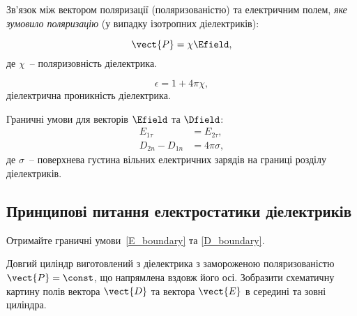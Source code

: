 \begin{Theory}
  Зв'язок між вектором поляризації (поляризованістю) та електричним полем, \emph{яке зумовило поляризацію} (у випадку ізотропних діелектриків):

  \begin{equation}
	  \vect{P} = \chi\Efield,
  \end{equation}
  де $\chi$~-- поляризовність діелектрика.

  \begin{equation}
	  \epsilon = 1 + 4\pi\chi,
  \end{equation}
  діелектрична проникність діелектрика.


  Граничні умови для векторів $\Efield$ та $\Dfield$:
  \begin{align}
	  E_{1\tau}       & = E_{2\tau},  \label{E_boundary} \\
	  D_{2n} - D_{1n} & = 4\pi\sigma, \label{D_boundary}
  \end{align}
  де $\sigma$~-- поверхнева густина вільних електричних зарядів на границі розділу діелектриків.
\end{Theory}

\subsection*{Принципові питання електростатики діелектриків}

\begin{problem}
	Отримайте граничні умови~\ref{E_boundary} та \ref{D_boundary}.
\end{problem}


\begin{problem}
	Довгий циліндр виготовлений з діелектрика з замороженою поляризованістю $\vect{P} = \const$, що напрямлена вздовж його осі. Зобразити схематичну картину полів вектора $\vect{D}$ та вектора $\vect{E}$ в середині та зовні циліндра.
\end{problem}

